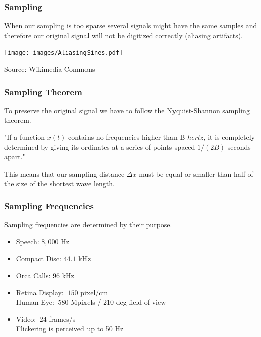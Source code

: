 \begin{frame}
    \frametitle{Sampling}
    When our sampling is too sparse several signals might have the same samples and therefore our original signal will not be digitized correctly (aliasing artifacts).\newline

    \begin{center}
        \texttt{[image: images/AliasingSines.pdf]}
        \begin{flushright}
            \scriptsize Source: Wikimedia Commons$\quad$
        \end{flushright}
    \end{center}
\end{frame}



\begin{frame}
    \frametitle{Sampling Theorem}
    To preserve the original signal we have to follow the Nyquist-Shannon sampling theorem.\newline

    \begin{myDefinition}
        "If a function $x(t)$ contains no frequencies higher than B $hertz$, it is completely determined by giving its ordinates at a series of points spaced $1/(2B)$ seconds apart."
    \end{myDefinition}

    \vspace{5mm}

    This means that our sampling distance $\Delta x$ must be equal or smaller than half of the size of the shortest wave length.
\end{frame}

\begin{frame}
    \frametitle{Sampling Frequencies}
    Sampling frequencies are determined by their purpose.\newline

    \begin{itemize}
        \item Speech: $8,000$ Hz
        \item Compact Disc: $44.1$ kHz
        \item Orca Calls: $96$ kHz
        \item Retina Display: $~ 150$ pixel/cm \\
                 Human Eye: $~580$ Mpixels / 210 deg field of view
        \item Video: $~24$ frames/s\\
                 Flickering is perceived up to 50 Hz
    \end{itemize}

    \vspace{5mm}

\end{frame}



